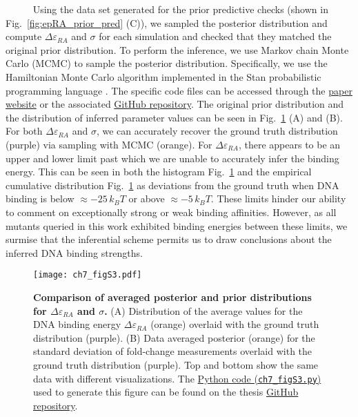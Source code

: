\documentclass[12pt]{caltech_thesis}
\begin{document}
~~~~~ Using the data set generated for the prior predictive checks
(shown in Fig.~\ref{fig:epRA_prior_pred} (C)), we sampled the posterior
distribution and compute \(\Delta\varepsilon_{RA}\) and \(\sigma\) for
each simulation and checked that they matched the original prior
distribution. To perform the inference, we use Markov chain Monte Carlo
(MCMC) to sample the posterior distribution. Specifically, we use the
Hamiltonian Monte Carlo algorithm implemented in the Stan probabilistic
programming language \autocite{carpenter2017}. The specific code files
can be accessed through the
\href{http://rpgroup.caltech.edu/mwc_mutants}{paper website} or the
associated \href{https://github.com/rpgroup-pboc/mwc_mutants}{GitHub
repository}. The original prior distribution and the distribution of
inferred parameter values can be seen in Fig.~\ref{fig:epRA_sbc} (A) and
(B). For both \(\Delta\varepsilon_{RA}\) and \(\sigma\), we can
accurately recover the ground truth distribution (purple) via sampling
with MCMC (orange). For \(\Delta\varepsilon_{RA}\), there appears to be
an upper and lower limit past which we are unable to accurately infer
the binding energy. This can be seen in both the histogram
Fig.~\ref{fig:epRA_sbc} and the empirical cumulative distribution
Fig.~\ref{fig:epRA_sbc} as deviations from the ground truth when DNA
binding is below \(\approx -25\,k_BT\) or above \(\approx -5\,k_BT\).
These limits hinder our ability to comment on exceptionally strong or
weak binding affinities. However, as all mutants queried in this work
exhibited binding energies between these limits, we surmise that the
inferential scheme permits us to draw conclusions about the inferred DNA
binding strengths.

\hypertarget{fig:epRA_sbc}{%
\begin{figure}
\centering
\texttt{[image: ch7\_figS3.pdf]}
\caption[{Comparison of averaged posterior and prior distributions for
DNA binding energy and homoscedastic error.}]{\textbf{Comparison of
averaged posterior and prior distributions for
\(\Delta\varepsilon_{RA}\) and \(\sigma\).} (A) Distribution of the
average values for the DNA binding energy \(\Delta\varepsilon_{RA}\)
(orange) overlaid with the ground truth distribution (purple). (B) Data
averaged posterior (orange) for the standard deviation of fold-change
measurements overlaid with the ground truth distribution (purple). Top
and bottom show the same data with different visualizations. The
\href{https://github.com/gchure/phd/blob/master/src/chapter_07/code/ch7_figS3.py}{Python
code (\texttt{ch7\_figS3.py})} used to generate this figure can be found
on the thesis \href{https://github.com/gchure/phd}{GitHub repository}.}
\label{fig:epRA_sbc}
\end{figure}
}
\end{document}
